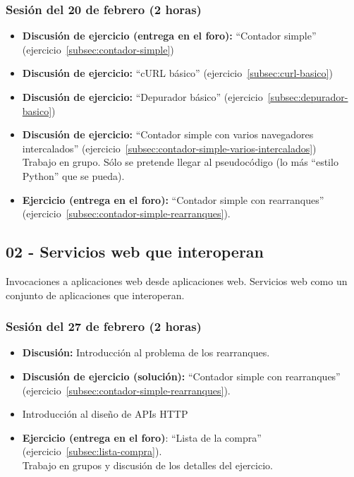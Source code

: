 \documentclass[a4paper,12pt]{article}
\begin{document}
\subsubsection{Sesión del 20 de febrero (2 horas)}

\begin{itemize}
\item \textbf{Discusión de ejercicio (entrega en el foro):} ``Contador simple'' (ejercicio~\ref{subsec:contador-simple})
\item \textbf{Discusión de ejercicio:} ``cURL básico'' (ejercicio~\ref{subsec:curl-basico})
\item \textbf{Discusión de ejercicio:} ``Depurador básico'' (ejercicio~\ref{subsec:depurador-basico})
\item \textbf{Discusión de ejercicio:} ``Contador simple con varios 
navegadores intercalados'' (ejercicio~\ref{subsec:contador-simple-varios-intercalados}) \\
  Trabajo en grupo. Sólo se pretende llegar al pseudocódigo (lo más ``estilo Python'' que se pueda).
\item \textbf{Ejercicio (entrega en el foro):} ``Contador simple con rearranques'' (ejercicio~\ref{subsec:contador-simple-rearranques}).
\end{itemize}


\subsection{02 - Servicios web que interoperan}

Invocaciones a aplicaciones web desde aplicaciones web. Servicios web como un conjunto de aplicaciones que interoperan.


\subsubsection{Sesión del 27 de febrero (2 horas)}

\begin{itemize}
\item \textbf{Discusión:} Introducción al problema de los rearranques.
\item \textbf{Discusión de ejercicio (solución):} ``Contador simple con rearranques'' (ejercicio~\ref{subsec:contador-simple-rearranques}).
\item Introducción al diseño de APIs HTTP
\item \textbf{Ejercicio (entrega en el foro)}: ``Lista de la compra'' (ejercicio~\ref{subsec:lista-compra}). \\
  Trabajo en grupos y discusión de los detalles del ejercicio.
\end{itemize}
\end{document}

